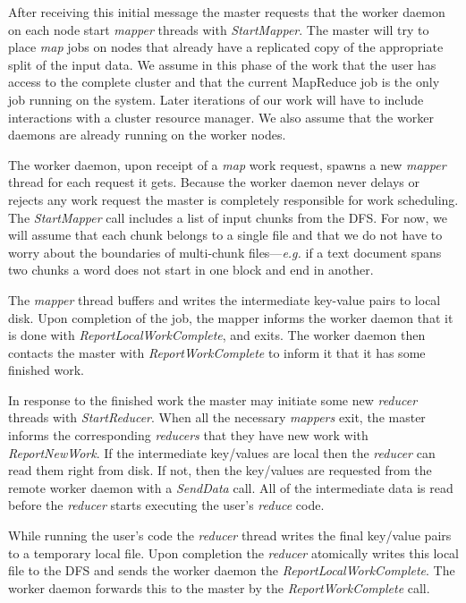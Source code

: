 \documentclass[10pt,letter,final,article,twocolumn]{article} %
\newcommand{\rpc}[1]{\emph{#1}}
\begin{document}
After receiving this initial message the master requests that the worker daemon on each node start \emph{mapper} threads with \rpc{StartMapper}. The master will try to place \emph{map} jobs on nodes that already have a replicated copy of the appropriate split of the input data.  We assume in this phase of the work that the user has access to the complete cluster and that the current MapReduce job is the only job running on the system. Later iterations of our work will have to include interactions with a cluster resource manager. We also assume that the worker daemons are already running on the worker nodes.

The worker daemon, upon receipt of a \emph{map} work request, spawns a new \emph{mapper} thread for each request it gets. Because the worker daemon never delays or rejects any work request the master is completely responsible for work scheduling. The  \rpc{StartMapper} call includes a list of input chunks from the DFS. For now, we will assume that each chunk belongs to a single file and that we do not have to worry about the boundaries of multi-chunk files---\textit{e.g.} if a text document spans two chunks a word does not start in one block and end in another.

The \emph{mapper} thread buffers and writes the intermediate key-value pairs to local disk. Upon completion of the job, the mapper informs the worker daemon that it is done with \rpc{ReportLocalWorkComplete}, and exits. The worker daemon then contacts the master with \rpc{ReportWorkComplete} to inform it that it has some finished work.

In response to the finished work the master may initiate some new \emph{reducer} threads with \rpc{StartReducer}. When all the necessary \emph{mappers} exit, the master informs the corresponding \emph{reducers} that they have new work with \rpc{ReportNewWork}. If the intermediate key/values  are local then the \emph{reducer} can read them right from disk. If not, then the key/values are requested from the remote worker daemon with a \rpc{SendData} call. All of the intermediate data is read before the \emph{reducer} starts executing the user's \emph{reduce} code.

While running the user's code the \emph{reducer} thread writes the final key/value pairs to a temporary local file. Upon completion the \emph{reducer} atomically writes this local file to the DFS and sends the worker daemon the \rpc{ReportLocalWorkComplete}. The worker daemon forwards this to the master by the \rpc{ReportWorkComplete} call.
\end{document}
